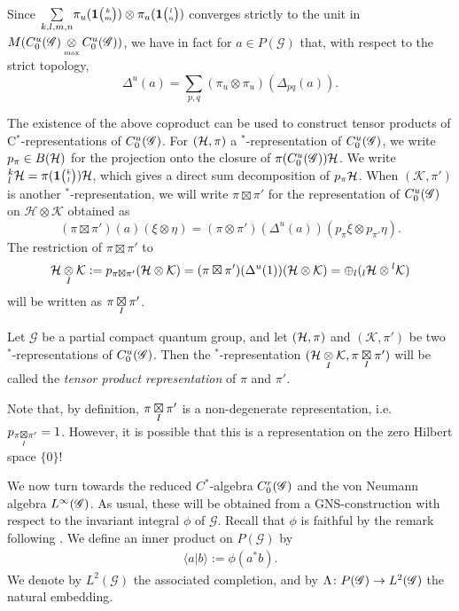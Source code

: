 Since $\underset{k,l,m,n}{\sum} \pi_u(\mathbf{1}{\tiny {\begin{pmatrix} k\\m\end{pmatrix}}})\otimes \pi_u(\mathbf{1}{\tiny {\begin{pmatrix} l\\n\end{pmatrix}}})$ converges strictly to the unit in $M(C_0^u(\mathscr{G})\underset{{\scriptscriptstyle \mathrm{ max}}}{\otimes} C_0^u(\mathscr{G}))$, we have in fact for $a\in P(\mathscr{G})$ that, with respect to the strict topology, \[\Delta^u(a) = \sum_{p,q} (\pi_{u} \otimes \pi_{u})(\Delta_{pq}(a)).\]

The existence of the above coproduct can be used to construct tensor products of C$^*$-representations of $C^{u}_{0}(\mathscr{G})$. For $(\mathcal{H},\pi)$ a $^*$-representation of $C^{u}_{0}(\mathscr{G})$, we write $p_{\pi}\in B(\mathcal{H})$ for the projection onto the closure of $\pi(C^{u}_{0}(\mathscr{G}))\mathcal{H}$. We write ${}^{k}_{l}\mathcal{H} = \pi(\mathbf{1}{\tiny {\begin{pmatrix} k\\l\end{pmatrix}}})\mathcal{H}$, which gives a direct sum decomposition of $p_{\pi}\mathcal{H}$.  When $(\mathcal{K},\pi')$ is another $^*$-representation, we will write $\pi \boxtimes \pi'$ for the representation of $C^{u}_{0}(\mathscr{G})$ on $\mathcal{H}\otimes \mathcal{K}$ obtained as \[(\pi \boxtimes \pi')(a)(\xi\otimes \eta) = (\pi\otimes \pi')(\Delta^u(a))(p_{\pi}\xi\otimes p_{\pi'}\eta).\] The restriction of $\pi\boxtimes \pi'$ to \[\mathcal{H}\underset{I}{\otimes} \mathcal{K} := p_{\pi \boxtimes \pi'}(\mathcal{H}\otimes \mathcal{K}) = (\pi \boxtimes \pi')(\Delta^u(1))(\mathcal{H}\otimes \mathcal{K})= \oplus_l ({}_l\mathcal{H}\otimes {}^l\mathcal{K})\] will be written as $\pi\underset{I}{\boxtimes} \pi'$. 

\begin{Def}\label{DefTenProd}  Let $\mathscr{G}$ be a partial compact quantum group, and let $(\mathcal{H},\pi)$ and $(\mathcal{K},\pi')$ be two $^*$-representations of $C^{u}_{0}(\mathscr{G})$. Then the $^*$-representation $(\mathcal{H}\underset{I}{\otimes} \mathcal{K},\pi\underset{I}{\boxtimes} \pi')$ will be called the \emph{tensor product representation} of $\pi$ and $\pi'$. 
\end{Def} 

Note that, by definition, $\pi\underset{I}{\boxtimes} \pi'$ is a non-degenerate representation, i.e.~ $p_{\pi\underset{I}{\boxtimes} \pi'} = 1$. However, it is possible that this is a representation on the zero Hilbert space $\{0\}$!



We now turn towards the reduced $C^{*}$-algebra $C^{r}_{0}(\mathscr{G})$ and the von Neumann algebra
$L^{\infty}(\mathscr{G})$. As usual, these will be obtained from a GNS-construction with respect to the invariant
integral $\phi$ of $\mathscr{G}$. Recall that $\phi$ is faithful by the remark following \cite[Corollary 2.16]{DCT1}.  We define an inner product on $P(\mathscr{G})$ by
\begin{align*}
  \langle a|b\rangle :=\phi(a^{*}b).
\end{align*}
We denote by $L^{2}(\mathscr{G})$ the associated completion, and by
$\Lambda \colon P(\mathscr{G}) \to L^{2}(\mathscr{G})$ the natural embedding.

